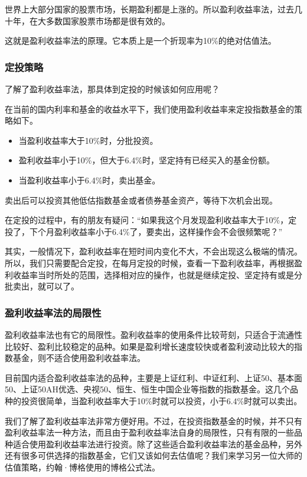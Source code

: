 世界上大部分国家的股票市场，长期盈利都是上涨的。所以盈利收益率法，过去几十年，在大多数国家股票市场都是很有效的。

这就是盈利收益率法的原理。它本质上是一个折现率为10\%的绝对估值法。

\subsubsection{定投策略}

了解了盈利收益率法，那具体到定投的时候该如何应用呢？

在当前的国内利率和基金的收益水平下，我们使用盈利收益率来定投指数基金的策略如下。

\begin{itemize}
\item 当盈利收益率大于10\%时，分批投资。
\item 盈利收益率小于10\%，但大于6.4\%时，坚定持有已经买入的基金份额。
\item 当盈利收益率小于6.4\%时，卖出基金。
\end{itemize}

卖出后可以投资其他低估指数基金或者债券基金资产，等待下次机会出现。

在定投的过程中，有的朋友有疑问：“如果我这个月发现盈利收益率大于10\%，定投了，下个月盈利收益率小于6.4\%了，要卖出，这样操作会不会很频繁呢？”

其实，一般情况下，盈利收益率在短时间内变化不大，不会出现这么极端的情况。所以，我们只需要配合定投，在每月定投的时候，查看一下盈利收益率，再根据盈利收益率当时所处的范围，选择相对应的操作，也就是继续定投、坚定持有或是分批卖出，就可以了。

\subsubsection{盈利收益率法的局限性}

盈利收益率法也有它的局限性。盈利收益率的使用条件比较苛刻，只适合于流通性比较好、盈利比较稳定的品种。如果是盈利增长速度较快或者盈利波动比较大的指数基金，则不适合使用盈利收益率法。

目前国内适合盈利收益率法的品种，主要是上证红利、中证红利、上证50、基本面50、上证50AH优选、央视50、恒生、恒生中国企业等指数的指数基金。这几个品种的投资很简单，当盈利收益率大于10\%时就可以投资，小于6.4\%时就可以卖出。

我们了解了盈利收益率法非常方便好用。不过，在投资指数基金的时候，并不只有盈利收益率法一种方法，而且由于盈利收益率法自身的局限性，只有有限的一些品种适合使用盈利收益率法进行投资。除了这些适合盈利收益率法的基金品种，另外还有很多可供选择的指数基金，它们又该如何去估值呢？我们来学习另一位大师的估值策略，约翰·博格使用的博格公式法。

